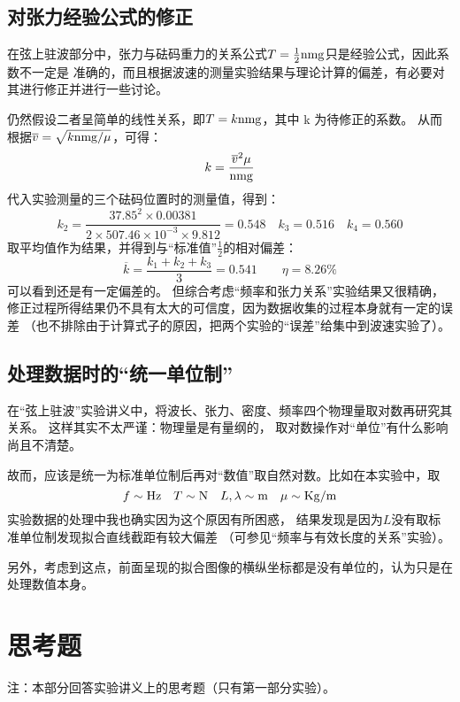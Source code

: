 \documentclass[11pt]{article}
\begin{document}
\subsection{对张力经验公式的修正}
在弦上驻波部分中，张力与砝码重力的关系公式$T=\frac12\rm nmg$只是经验公式，因此系数不一定是
准确的，而且根据波速的测量实验结果与理论计算的偏差，有必要对其进行修正并进行一些讨论。

仍然假设二者呈简单的线性关系，即$T=k\rm nmg$，其中 k 为待修正的系数。
从而根据$\overline v=\sqrt{k{\rm nmg}/\mu}$，可得：
\[
    k=\frac{\overline v^2\mu}{\rm nmg}
\]
代入实验测量的三个砝码位置时的测量值，得到：
\[
  k_2=\frac{37.85^2\times 0.00381}{2\times 507.46\times 10^{-3}\times 9.812} =0.548\quad
  k_3=0.516\quad k_4=0.560 
\]
取平均值作为结果，并得到与“标准值”$\frac12$的相对偏差：
\[
   \overline k=\frac{k_1+k_2+k_3}{3}= 0.541\qquad \eta=8.26\%
\]
可以看到还是有一定偏差的。
但综合考虑“频率和张力关系”实验结果又很精确，
修正过程所得结果仍不具有太大的可信度，因为数据收集的过程本身就有一定的误差
（也不排除由于计算式子的原因，把两个实验的“误差”给集中到波速实验了）。

\subsection{处理数据时的“统一单位制”}

在“弦上驻波”实验讲义中，将波长、张力、密度、频率四个物理量取对数再研究其关系。
这样其实不太严谨：物理量是有量纲的，
取对数操作对“单位”有什么影响尚且不清楚。

故而，应该是统一为标准单位制后再对“数值”取自然对数。比如在本实验中，取
\[
   f\sim {\rm Hz}\quad T\sim{\rm N}\quad L,\lambda\sim{\rm m}\quad \mu\sim{\rm Kg/m}
\]
实验数据的处理中我也确实因为这个原因有所困惑，
结果发现是因为$L$没有取标准单位制发现拟合直线截距有较大偏差
（可参见“频率与有效长度的关系”实验）。

另外，考虑到这点，前面呈现的拟合图像的横纵坐标都是没有单位的，认为只是在处理数值本身。




\section{思考题}

\begin{kaishu}
    注：本部分回答实验讲义上的思考题（只有第一部分实验）。
\end{kaishu}
\end{document}
